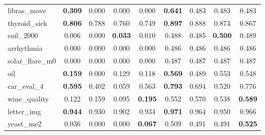 \begin{figure}[ht]
\begin{tabular}{p{22mm}|*4{p{14mm}}|*4{p{14mm}}}
        libras\_move&\multicolumn{1}{c}{\textbf{0.309}}&\multicolumn{1}{c}{0.000}&\multicolumn{1}{c}{0.000}&\multicolumn{1}{c|}{0.000}&\multicolumn{1}{c}{\textbf{0.641}}&\multicolumn{1}{c}{0.483}&\multicolumn{1}{c}{0.483}&\multicolumn{1}{c}{0.483}\\
        thyroid\_sick&\multicolumn{1}{c}{\textbf{0.806}}&\multicolumn{1}{c}{0.788}&\multicolumn{1}{c}{0.760}&\multicolumn{1}{c|}{0.749}&\multicolumn{1}{c}{\textbf{0.897}}&\multicolumn{1}{c}{0.888}&\multicolumn{1}{c}{0.874}&\multicolumn{1}{c}{0.867}\\
        coil\_2000&\multicolumn{1}{c}{0.006}&\multicolumn{1}{c}{0.000}&\multicolumn{1}{c}{\textbf{0.033}}&\multicolumn{1}{c|}{0.010}&\multicolumn{1}{c}{0.488}&\multicolumn{1}{c}{0.485}&\multicolumn{1}{c}{\textbf{0.500}}&\multicolumn{1}{c}{0.489}\\
        arrhythmia&\multicolumn{1}{c}{0.000}&\multicolumn{1}{c}{0.000}&\multicolumn{1}{c}{0.000}&\multicolumn{1}{c|}{0.000}&\multicolumn{1}{c}{0.486}&\multicolumn{1}{c}{0.486}&\multicolumn{1}{c}{0.486}&\multicolumn{1}{c}{0.486}\\
        solar\_flare\_m0&\multicolumn{1}{c}{0.000}&\multicolumn{1}{c}{0.000}&\multicolumn{1}{c}{0.000}&\multicolumn{1}{c|}{0.000}&\multicolumn{1}{c}{0.487}&\multicolumn{1}{c}{0.487}&\multicolumn{1}{c}{0.487}&\multicolumn{1}{c}{0.487}\\
        oil&\multicolumn{1}{c}{\textbf{0.159}}&\multicolumn{1}{c}{0.000}&\multicolumn{1}{c}{0.129}&\multicolumn{1}{c|}{0.118}&\multicolumn{1}{c}{\textbf{0.569}}&\multicolumn{1}{c}{0.489}&\multicolumn{1}{c}{0.553}&\multicolumn{1}{c}{0.548}\\
        car\_eval\_4&\multicolumn{1}{c}{\textbf{0.595}}&\multicolumn{1}{c}{0.402}&\multicolumn{1}{c}{0.059}&\multicolumn{1}{c|}{0.563}&\multicolumn{1}{c}{\textbf{0.793}}&\multicolumn{1}{c}{0.694}&\multicolumn{1}{c}{0.520}&\multicolumn{1}{c}{0.776}\\
        wine\_quality&\multicolumn{1}{c}{0.122}&\multicolumn{1}{c}{0.159}&\multicolumn{1}{c}{0.095}&\multicolumn{1}{c|}{\textbf{0.195}}&\multicolumn{1}{c}{0.552}&\multicolumn{1}{c}{0.570}&\multicolumn{1}{c}{0.538}&\multicolumn{1}{c}{\textbf{0.589}}\\
        letter\_img&\multicolumn{1}{c}{\textbf{0.944}}&\multicolumn{1}{c}{0.930}&\multicolumn{1}{c}{0.902}&\multicolumn{1}{c|}{0.934}&\multicolumn{1}{c}{\textbf{0.971}}&\multicolumn{1}{c}{0.964}&\multicolumn{1}{c}{0.950}&\multicolumn{1}{c}{0.966}\\
        yeast\_me2&\multicolumn{1}{c}{0.036}&\multicolumn{1}{c}{0.000}&\multicolumn{1}{c}{0.000}&\multicolumn{1}{c|}{\textbf{0.067}}&\multicolumn{1}{c}{0.509}&\multicolumn{1}{c}{0.491}&\multicolumn{1}{c}{0.491}&\multicolumn{1}{c}{\textbf{0.525}}\\

\end{tabular}
\end{figure}
